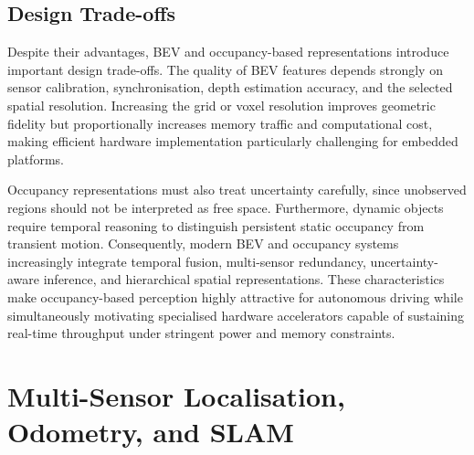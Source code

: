 \subsection{Design Trade-offs}

Despite their advantages, BEV and occupancy-based representations introduce important design trade-offs. The quality of BEV features depends strongly on sensor calibration, synchronisation, depth estimation accuracy, and the selected spatial resolution. Increasing the grid or voxel resolution improves geometric fidelity but proportionally increases memory traffic and computational cost, making efficient hardware implementation particularly challenging for embedded platforms.

Occupancy representations must also treat uncertainty carefully, since unobserved regions should not be interpreted as free space. Furthermore, dynamic objects require temporal reasoning to distinguish persistent static occupancy from transient motion. Consequently, modern BEV and occupancy systems increasingly integrate temporal fusion, multi-sensor redundancy, uncertainty-aware inference, and hierarchical spatial representations. These characteristics make occupancy-based perception highly attractive for autonomous driving while simultaneously motivating specialised hardware accelerators capable of sustaining real-time throughput under stringent power and memory constraints.

\section{Multi-Sensor Localisation, Odometry, and SLAM}
%


